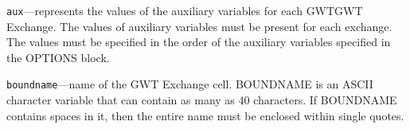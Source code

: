 \begin{description}
\item \texttt{aux}---represents the values of the auxiliary variables for each GWTGWT Exchange. The values of auxiliary variables must be present for each exchange. The values must be specified in the order of the auxiliary variables specified in the OPTIONS block.

\item \texttt{boundname}---name of the GWT Exchange cell.  BOUNDNAME is an ASCII character variable that can contain as many as 40 characters.  If BOUNDNAME contains spaces in it, then the entire name must be enclosed within single quotes.

\end{description}

